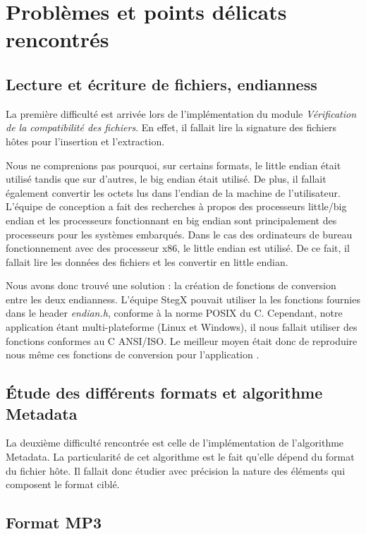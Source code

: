 \documentclass[11pt]{article}
\begin{document}
\section{Problèmes et points délicats rencontrés}

\subsection{Lecture et écriture de fichiers, endianness}

La première difficulté est arrivée lors de l'implémentation du module 
\textit{Vérification de la compatibilité des fichiers}. En effet, il fallait 
lire la signature des fichiers hôtes pour l'insertion et l'extraction. 

Nous ne comprenions pas pourquoi, sur certains formats, le little endian était
utilisé tandis que sur d'autres, le big endian était utilisé. De plus, il
fallait également convertir les octets lus dans l'endian de la machine de
l'utilisateur. L'équipe de conception a fait des recherches à propos des
processeurs little/big endian et les processeurs fonctionnant en big endian sont
principalement des processeurs pour les systèmes embarqués. Dans le cas des
ordinateurs de bureau fonctionnement avec des processeur x86, le little endian
est utilisé. De ce fait, il fallait lire les données des fichiers et les
convertir en little endian. 

Nous avons donc trouvé une solution : la création de fonctions de conversion
entre les deux endianness. L'équipe StegX pouvait utiliser la les fonctions
fournies dans le header \textit{endian.h}, conforme à la norme POSIX du C.
Cependant, notre application étant multi-plateforme (Linux et Windows), il nous
fallait utiliser des fonctions conformes au C ANSI/ISO. Le meilleur moyen était
donc de reproduire nous même ces fonctions de conversion pour l'application 
\label{endian}. 

\subsection{Étude des différents formats et algorithme Metadata}

La deuxième difficulté rencontrée est celle de l'implémentation de l'algorithme
Metadata. La particularité de cet algorithme est le fait qu'elle dépend du
format du fichier hôte. Il fallait donc étudier avec précision la nature 
des éléments qui composent le format ciblé.  

\subsection{Format MP3}
\end{document}
